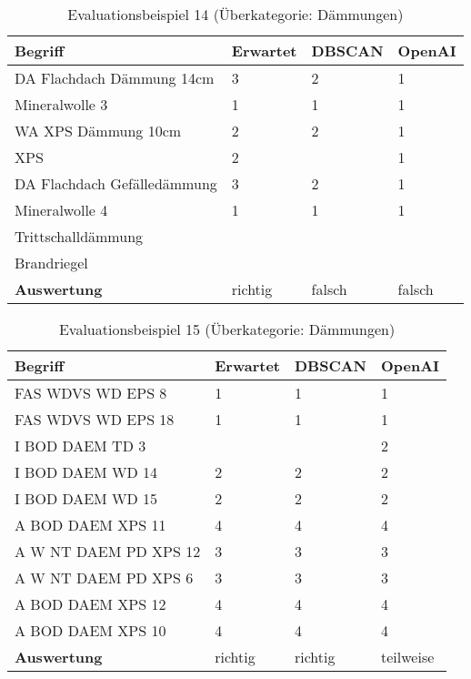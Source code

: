\begin{table}[h]
	
	\centering
	\begin{tabular}{|l|l|l|l|}
		\hline
		\textbf{Begriff} & \textbf{Erwartet} & \textbf{DBSCAN} & \textbf{OpenAI}\\ \hline
		   DA Flachdach Dämmung 14cm & 3 & 2 & 1 \\ \hline
		Mineralwolle 3 & 1 & 1 & 1 \\ \hline
		WA XPS Dämmung 10cm & 2 & 2 & 1 \\ \hline
		XPS & 2 & ~ & 1 \\ \hline
		DA Flachdach Gefälledämmung & 3 & 2 & 1 \\ \hline
		Mineralwolle 4 & 1 & 1 & 1 \\ \hline
		Trittschalldämmung & ~ & ~ & ~ \\ \hline
		Brandriegel  & ~ & ~ & ~ \\ \hline
		\textbf{Auswertung} & richtig & falsch & falsch \\ \hline
	\end{tabular}
	\caption{Evaluationsbeispiel 14 (Überkategorie: Dämmungen)}
	\label{t:evaluation-example14}
\end{table}

\begin{table}[h]
	
	\centering
	\begin{tabular}{|l|l|l|l|}
		\hline
		\textbf{Begriff} & \textbf{Erwartet} & \textbf{DBSCAN} & \textbf{OpenAI}\\ \hline
		  FAS WDVS WD EPS 8 & 1 & 1 & 1 \\ \hline
		FAS WDVS WD EPS 18 & 1 & 1 & 1 \\ \hline
		I BOD DAEM TD 3 & ~ & ~ & 2 \\ \hline
		I BOD DAEM WD 14 & 2 & 2 & 2 \\ \hline
		I BOD DAEM WD 15 & 2 & 2 & 2 \\ \hline
		A BOD DAEM XPS 11 & 4 & 4 & 4 \\ \hline
		A W NT DAEM PD XPS 12 & 3 & 3 & 3 \\ \hline
		A W NT DAEM PD XPS 6 & 3 & 3 & 3 \\ \hline
		A BOD DAEM XPS 12 & 4 & 4 & 4 \\ \hline
		A BOD DAEM XPS 10 & 4 & 4 & 4 \\ \hline
		\textbf{Auswertung} & richtig & richtig & teilweise \\ \hline
	\end{tabular}
	\caption{Evaluationsbeispiel 15 (Überkategorie: Dämmungen)}
	\label{t:evaluation-example15}
\end{table}

